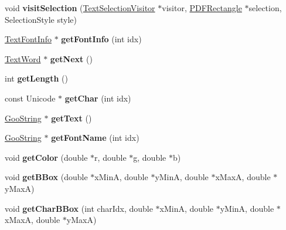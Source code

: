 \begin{DoxyCompactItemize}
\mbox{\label{class_text_word_ae69bfb1ecda80d3e69508befc7ece971}} 
void {\bfseries visit\+Selection} (\hyperlink{class_text_selection_visitor}{Text\+Selection\+Visitor} $\ast$visitor, \hyperlink{class_p_d_f_rectangle}{P\+D\+F\+Rectangle} $\ast$selection, Selection\+Style style)
\item 
\mbox{\label{class_text_word_ad836561d4c95164c076c19a99256580e}} 
\hyperlink{class_text_font_info}{Text\+Font\+Info} $\ast$ {\bfseries get\+Font\+Info} (int idx)
\item 
\mbox{\label{class_text_word_a880410bbb93d9cba10068fd7885c42b6}} 
\hyperlink{class_text_word}{Text\+Word} $\ast$ {\bfseries get\+Next} ()
\item 
\mbox{\label{class_text_word_a552cac4a0f28dd437c87495d361f812a}} 
int {\bfseries get\+Length} ()
\item 
\mbox{\label{class_text_word_a287d6a39bccf37aaf0d028a67704f027}} 
const Unicode $\ast$ {\bfseries get\+Char} (int idx)
\item 
\mbox{\label{class_text_word_a6848697e429be922ab5925027ffad886}} 
\hyperlink{class_goo_string}{Goo\+String} $\ast$ {\bfseries get\+Text} ()
\item 
\mbox{\label{class_text_word_afb970c67c7d59c0238c9d554dfadc02b}} 
\hyperlink{class_goo_string}{Goo\+String} $\ast$ {\bfseries get\+Font\+Name} (int idx)
\item 
\mbox{\label{class_text_word_a0f9dae78f38a27500d49aa73ff203ccd}} 
void {\bfseries get\+Color} (double $\ast$r, double $\ast$g, double $\ast$b)
\item 
\mbox{\label{class_text_word_aca0df3e9603e3dbb8765c0fb51bdeba6}} 
void {\bfseries get\+B\+Box} (double $\ast$x\+MinA, double $\ast$y\+MinA, double $\ast$x\+MaxA, double $\ast$y\+MaxA)
\item 
\mbox{\label{class_text_word_a6e827bbe0218f8853df4c3b23b1f18f8}} 
void {\bfseries get\+Char\+B\+Box} (int char\+Idx, double $\ast$x\+MinA, double $\ast$y\+MinA, double $\ast$x\+MaxA, double $\ast$y\+MaxA)

\end{DoxyCompactItemize}
